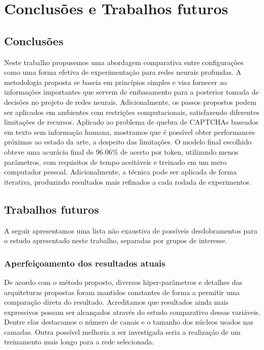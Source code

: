 \chapter{Conclusões e Trabalhos futuros}\label{cap:concusao}

\section{Conclusões}

Neste trabalho propusemos uma abordagem comparativa entre configurações como uma forma efetiva de experimentação para redes neurais profundas. A metodologia proposta se baseia em princípios simples e visa fornecer ao informações importantes que servem de embasamento para a posterior tomada de decisões no projeto de redes neurais. Adicionalmente, os passos propostos podem ser aplicados em ambientes com restrições computacionais, satisfazendo diferentes limitações de recursos. Aplicado ao problema de quebra de CAPTCHAs baseados em texto sem informação humana, mostramos que é possível obter performances próximas ao estado da arte, a despeito das limitações. O modelo final escolhido obteve uma acurácia final de $96.06\%$ de acerto por token, utilizando menos parâmetros, com requisitos de tempo aceitáveis e treinado em um mero computador pessoal. Adicionalmente, a técnica pode ser aplicada de forma iterativa, produzindo resultados mais refinados a cada rodada de experimentos.

\section{Trabalhos futuros}

A seguir apresentamos uma lista não exaustiva de possíveis desdobramentos para o estudo apresentado neste trabalho, separadas por grupos de interesse.

\subsection*{Aperfeiçoamento dos resultados atuais}
De acordo com o método proposto, diversos hiper-parâmetros e detalhes das arquiteturas propostas foram mantidos constantes de forma a permitir uma comparação direta do resultado. Acreditamos que resultados ainda mais expressivos possam ser alcançados através do estudo comparativo dessas variáveis. Dentre elas destacamos o número de canais e o tamanho dos núcleos usados nas camadas. Outra possível melhoria a ser investigada seria a realização de um treinamento mais longo para a rede selecionada.

